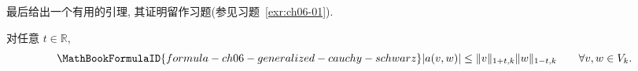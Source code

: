 最后给出一个有用的引理, 其证明留作习题(参见习题~\ref{exr:ch06-01}).

\begin{Lemma}
\label{lem:ch06-generalized-cauchy-schwarz}
对任意 $t\in\mathbb R$,
\[
\MathBookFormulaID{formula-ch06-generalized-cauchy-schwarz}
|a(v,w)|\leq\|v\|_{1+t,k}\|w\|_{1-t,k}
\qquad\forall v,w\in V_k.
\]
\end{Lemma}
